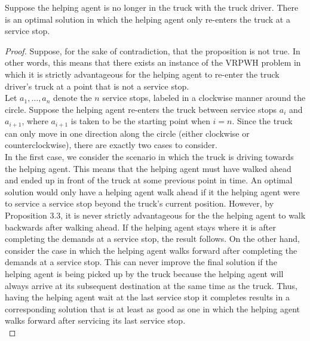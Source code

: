 \documentclass[12pt]{scrartcl}
\begin{document}
\begin{proposition}
 Suppose the helping agent is no longer in the truck with the truck driver. There is an optimal solution in which the helping agent only re-enters the truck at a service stop.
\end{proposition}
\begin{proof}
Suppose, for the sake of contradiction, that the proposition is not true. In other words, this means that there exists an instance of the VRPWH problem in which it is strictly advantageous for the helping agent to re-enter the truck driver's truck at a point that is not a service stop. \\

Let $a_1, \ldots, a_n$ denote the $n$ service stops, labeled in a clockwise manner around the circle. Suppose the helping agent re-enters the truck between service stops $a_{i}$ and $a_{i + 1}$, where $a_{i + 1}$ is taken to be the starting point when $i = n$. Since the truck can only move in one direction along the circle (either clockwise or counterclockwise), there are exactly two cases to consider. \\

In the first case, we consider the scenario in which the truck is driving towards the helping agent. This means that the helping agent must have walked ahead and ended up in front of the truck at some previous point in time. An optimal solution would only have a helping agent walk ahead if it the helping agent were to service a service stop beyond the truck's current position. However, by Proposition $3.3$, it is never strictly advantageous for the the helping agent to walk backwards after walking ahead. If the helping agent stays where it is after completing the demands at a service stop, the result follows. On the other hand, consider the case in which the helping agent walks forward after completing the demands at a service stop. This can never improve the final solution if the helping agent is being picked up by the truck because the helping agent will always arrive at its subsequent destination at the same time as the truck. Thus, having the helping agent wait at the last service stop it completes results in a corresponding solution that is at least as good as one in which the helping agent walks forward after servicing its last service stop. \\


\end{proof}
\end{document}
